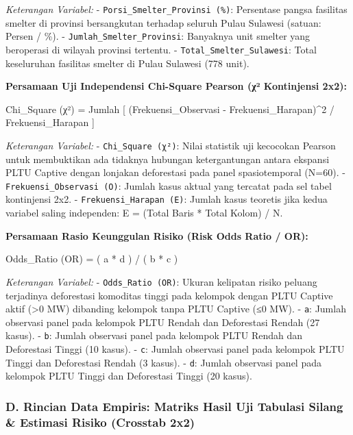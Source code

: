 \documentclass[
]{article}
\newenvironment{Shaded}{}{}
\newcommand{\NormalTok}[1]{#1}
\begin{document}
\emph{Keterangan Variabel:} - \texttt{Porsi\_Smelter\_Provinsi\ (\%)}:
Persentase pangsa fasilitas smelter di provinsi bersangkutan terhadap
seluruh Pulau Sulawesi (satuan: Persen / \%). -
\texttt{Jumlah\_Smelter\_Provinsi}: Banyaknya unit smelter yang
beroperasi di wilayah provinsi tertentu. -
\texttt{Total\_Smelter\_Sulawesi}: Total keseluruhan fasilitas smelter
di Pulau Sulawesi (778 unit).

\textbf{Persamaan Uji Independensi Chi-Square Pearson (χ² Kontinjensi
2x2):}

\begin{Shaded}
\begin{Highlighting}[]
\NormalTok{Chi\_Square (χ²) = Jumlah [ (Frekuensi\_Observasi {-} Frekuensi\_Harapan)\^{}2 / Frekuensi\_Harapan ]}
\end{Highlighting}
\end{Shaded}

\emph{Keterangan Variabel:} - \texttt{Chi\_Square\ (χ²)}: Nilai
statistik uji kecocokan Pearson untuk membuktikan ada tidaknya hubungan
ketergantungan antara ekspansi PLTU Captive dengan lonjakan deforestasi
pada panel spasiotemporal (N=60). - \texttt{Frekuensi\_Observasi\ (O)}:
Jumlah kasus aktual yang tercatat pada sel tabel kontinjensi 2x2. -
\texttt{Frekuensi\_Harapan\ (E)}: Jumlah kasus teoretis jika kedua
variabel saling independen: E = (Total Baris * Total Kolom) / N.

\textbf{Persamaan Rasio Keunggulan Risiko (Risk Odds Ratio / OR):}

\begin{Shaded}
\begin{Highlighting}[]
\NormalTok{Odds\_Ratio (OR) = ( a * d ) / ( b * c )}
\end{Highlighting}
\end{Shaded}

\emph{Keterangan Variabel:} - \texttt{Odds\_Ratio\ (OR)}: Ukuran
kelipatan risiko peluang terjadinya deforestasi komoditas tinggi pada
kelompok dengan PLTU Captive aktif (\textgreater0 MW) dibanding kelompok
tanpa PLTU Captive (≤0 MW). - \texttt{a}: Jumlah observasi panel pada
kelompok PLTU Rendah dan Deforestasi Rendah (27 kasus). - \texttt{b}:
Jumlah observasi panel pada kelompok PLTU Rendah dan Deforestasi Tinggi
(10 kasus). - \texttt{c}: Jumlah observasi panel pada kelompok PLTU
Tinggi dan Deforestasi Rendah (3 kasus). - \texttt{d}: Jumlah observasi
panel pada kelompok PLTU Tinggi dan Deforestasi Tinggi (20 kasus).

\subsubsection{D. Rincian Data Empiris: Matriks Hasil Uji Tabulasi
Silang \& Estimasi Risiko (Crosstab
2x2)}\label{d.-rincian-data-empiris-matriks-hasil-uji-tabulasi-silang-estimasi-risiko-crosstab-2x2}
\end{document}
